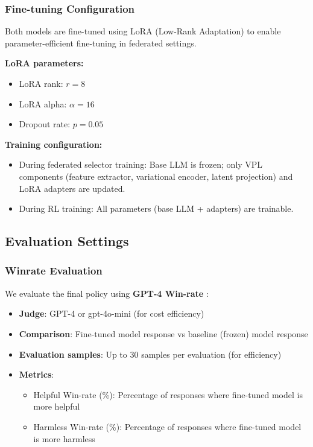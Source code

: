 \subsubsection{Fine-tuning Configuration}

Both models are fine-tuned using LoRA (Low-Rank Adaptation) \citep{hu2021lora} to enable parameter-efficient fine-tuning in federated settings.

\textbf{LoRA parameters:}
\begin{itemize}
    \item LoRA rank: $r = 8$
    \item LoRA alpha: $\alpha = 16$
    \item Dropout rate: $p = 0.05$
\end{itemize}

\textbf{Training configuration:}
\begin{itemize}
    \item During federated selector training: Base LLM is frozen; only VPL components (feature extractor, variational encoder, latent projection) and LoRA adapters are updated.
    \item During RL training: All parameters (base LLM + adapters) are trainable.
\end{itemize}

\subsection{Evaluation Settings}

\subsubsection{Winrate Evaluation}

We evaluate the final policy using \textbf{GPT-4 Win-rate} \citep{bai2022training}:

\begin{itemize}
    \item \textbf{Judge}: GPT-4 or gpt-4o-mini (for cost efficiency)
    \item \textbf{Comparison}: Fine-tuned model response vs baseline (frozen) model response
    \item \textbf{Evaluation samples}: Up to $30$ samples per evaluation (for efficiency)
    \item \textbf{Metrics}: 
    \begin{itemize}
        \item Helpful Win-rate (\%): Percentage of responses where fine-tuned model is more helpful
        \item Harmless Win-rate (\%): Percentage of responses where fine-tuned model is more harmless
    \end{itemize}
\end{itemize}

